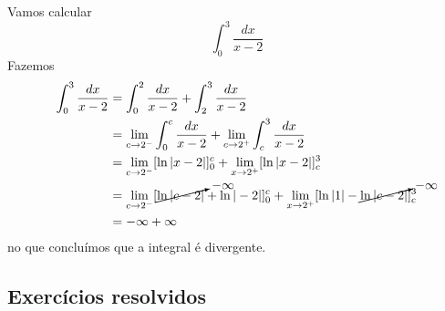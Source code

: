 \begin{ex}
  Vamos calcular
  \begin{equation}
    \int_0^3\frac{dx}{x-2}
  \end{equation}
  Fazemos
  \begin{align}
    \int_0^3\frac{dx}{x-2} &= \int_0^2\frac{dx}{x-2} + \int_2^3\frac{dx}{x-2}\\
                           &= \lim_{c\to 2^-}\int_0^c\frac{dx}{x-2} + \lim_{c\to 2^+}\int_c^3\frac{dx}{x-2}\\
                           &= \lim_{c\to 2^-}[\ln|x-2|]_0^c + \lim_{x\to 2^+}[\ln|x-2|]_c^3\\
                           &= \lim_{c\to 2^-}[\cancelto{-\infty}{\ln|c-2|} + \ln|-2|]_0^c + \lim_{x\to 2^+}[\ln|1| - \cancelto{-\infty}{\ln|c-2|}]_c^3\\
                           &= -\infty + \infty
  \end{align}
  no que concluímos que a integral é divergente.
\end{ex}

\subsection*{Exercícios resolvidos}


